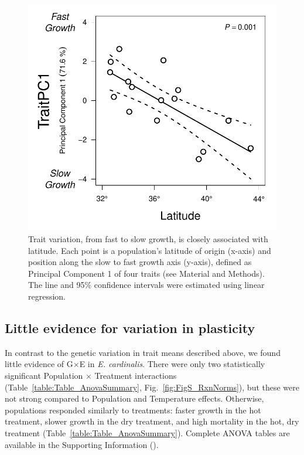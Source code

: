 \documentclass[11pt, oneside]{article}
\begin{document}

\begin{figure}[h!]
	\centerline{\includegraphics[width=1\textwidth]{Figures/Figure_PC1vLat.pdf}}
	\fontsize{10}{12}
	\selectfont
	\caption[Southern populations grow faster]{Trait variation, from fast to slow growth, is closely associated with latitude. Each point is a population's latitude of origin (x-axis) and position along the slow to fast growth axis (y-axis), defined as Principal Component 1 of four traits (see Material and Methods). The line and 95\% confidence intervals were estimated using linear regression.}
	\label{fig:Fig_PC1vLat}
\end{figure}

\subsection*{Little evidence for variation in plasticity}

In contrast to the genetic variation in trait means described above, we found little evidence of G$\times$E in \textit{E. cardinalis}. There were only two statistically significant Population $\times$ Treatment interactions (Table~\ref{table:Table_AnovaSummary}, Fig.~\ref{fig:FigS_RxnNorms}), but these were not strong compared to Population and Temperature effects. Otherwise, populations responded similarly to treatments: faster growth in the hot treatment, slower growth in the dry treatment, and high mortality in the hot, dry treatment (Table~\ref{table:Table_AnovaSummary}). Complete ANOVA tables are available in the Supporting Information (). 
\end{document}
